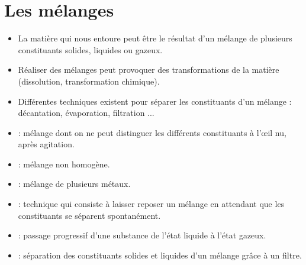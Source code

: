\documentclass[12pt,a4paper]{article}
\begin{document}
\newpage

\section{Les mélanges}

\begin{mybilan}
	\begin{itemize}
	\item La matière qui nous entoure peut être le résultat d'un mélange de plusieurs constituants solides, liquides ou gazeux.
		
	\item Réaliser des mélanges peut provoquer des transformations de la matière (dissolution, transformation chimique).
	
	\item Différentes techniques existent pour séparer les constituants d'un mélange : décantation, évaporation, filtration ...
\end{itemize}
\end{mybilan}

\begin{mydefs}
	\begin{itemize}
		\item {} : mélange dont on ne peut distinguer les différents constituants à l'\oe il nu, après agitation.
		
		\item {} : mélange non homogène.
		
		\item {} : mélange de plusieurs métaux.
		
		\item {} :  technique qui consiste à laisser reposer un mélange en attendant que les constituants se séparent spontanément.
		
		\item {} : passage progressif d'une substance de l'état liquide à l'état gazeux.
		
		\item {} : séparation des constituants solides et liquides d'un mélange grâce à un filtre.
	\end{itemize}
\end{mydefs}
\end{document}
